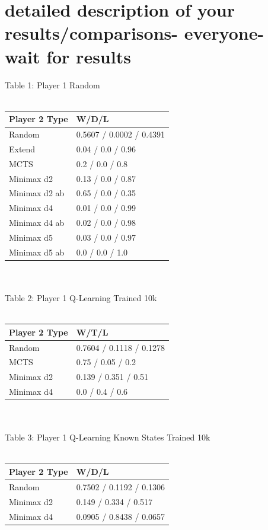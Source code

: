 \documentclass[12pt]{article}
\begin{document}
\section{detailed description of your results/comparisons- everyone- wait for results}
Table 1: Player 1 Random\\\\
\begin{tabular}{l | l}
Player 2 Type & W/D/L                    \\ \hline
Random        & 0.5607 / 0.0002 / 0.4391 \\
Extend        & 0.04 / 0.0 / 0.96        \\
MCTS          & 0.2 / 0.0 / 0.8          \\
Minimax d2    & 0.13 / 0.0 / 0.87        \\
Minimax d2 ab & 0.65 / 0.0 / 0.35        \\
Minimax d4    & 0.01 / 0.0 / 0.99        \\
Minimax d4 ab & 0.02 / 0.0 / 0.98        \\
Minimax d5    & 0.03 / 0.0 / 0.97        \\
Minimax d5 ab &  0.0 / 0.0 / 1.0     \\                  
\end{tabular}\\\\
Table 2: Player 1 Q-Learning Trained 10k\\\\
\begin{tabular}{l|l}
Player 2 Type               & W/T/L                                     \\ \hline
Random     & 0.7604 / 0.1118 / 0.1278 \\
MCTS                        & 0.75 / 0.05 / 0.2  \\
Minimax d2 & 0.139 / 0.351 / 0.51     \\
Minimax d4 & 0.0 / 0.4 / 0.6
\end{tabular}\\\\
Table 3: Player 1 Q-Learning Known States Trained 10k\\\\
\begin{tabular}{l|l}
Player 2 Type & W/D/L                    \\ \hline
Random        & 0.7502 / 0.1192 / 0.1306 \\
Minimax d2    & 0.149 / 0.334 / 0.517    \\
Minimax d4    &  0.0905 / 0.8438 / 0.0657                       
\end{tabular}\\\\
\end{document}
